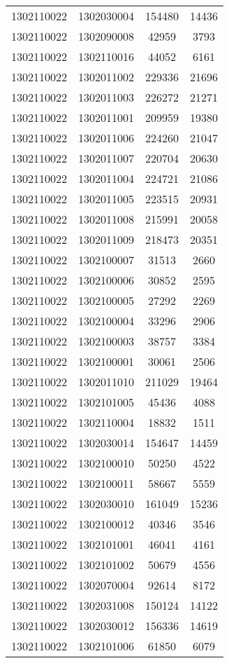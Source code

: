 \begin{longtable}{llcc}
1302110022 & 1302030004 & 154480 & 14436\\
1302110022 & 1302090008 & 42959 & 3793\\
1302110022 & 1302110016 & 44052 & 6161\\
1302110022 & 1302011002 & 229336 & 21696\\
1302110022 & 1302011003 & 226272 & 21271\\
1302110022 & 1302011001 & 209959 & 19380\\
1302110022 & 1302011006 & 224260 & 21047\\
1302110022 & 1302011007 & 220704 & 20630\\
1302110022 & 1302011004 & 224721 & 21086\\
1302110022 & 1302011005 & 223515 & 20931\\
1302110022 & 1302011008 & 215991 & 20058\\
1302110022 & 1302011009 & 218473 & 20351\\
1302110022 & 1302100007 & 31513 & 2660\\
1302110022 & 1302100006 & 30852 & 2595\\
1302110022 & 1302100005 & 27292 & 2269\\
1302110022 & 1302100004 & 33296 & 2906\\
1302110022 & 1302100003 & 38757 & 3384\\
1302110022 & 1302100001 & 30061 & 2506\\
1302110022 & 1302011010 & 211029 & 19464\\
1302110022 & 1302101005 & 45436 & 4088\\
1302110022 & 1302110004 & 18832 & 1511\\
1302110022 & 1302030014 & 154647 & 14459\\
1302110022 & 1302100010 & 50250 & 4522\\
1302110022 & 1302100011 & 58667 & 5559\\
1302110022 & 1302030010 & 161049 & 15236\\
1302110022 & 1302100012 & 40346 & 3546\\
1302110022 & 1302101001 & 46041 & 4161\\
1302110022 & 1302101002 & 50679 & 4556\\
1302110022 & 1302070004 & 92614 & 8172\\
1302110022 & 1302031008 & 150124 & 14122\\
1302110022 & 1302030012 & 156336 & 14619\\
1302110022 & 1302101006 & 61850 & 6079\\

\end{longtable}
